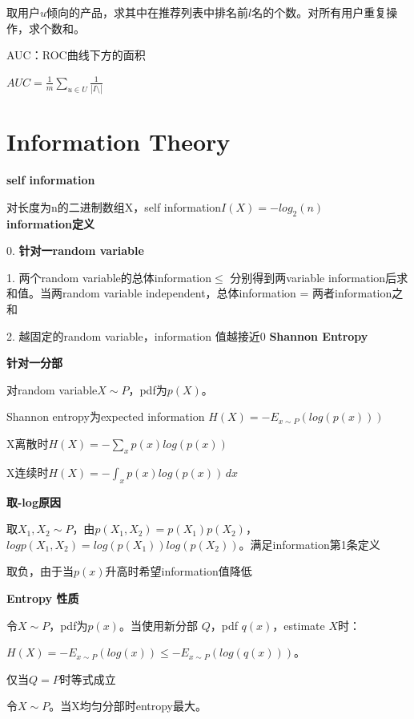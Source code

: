 \documentclass[UTF8]{ctexart}
\begin{document}
  \quad \quad \quad 取用户$u$倾向的产品，求其中在推荐列表中排名前$l$名的个数。对所有用户重复操作，求个数和。

  \quad \quad AUC：ROC曲线下方的面积

  \quad \quad \quad $AUC = \frac{1}{m}\sum_{u \in U}\frac{1}{|I \setminus |}$
  
\section{Information Theory}
\noindent \textbf{self information}

  对长度为n的二进制数组X，self information$I(X) = -log_2(n)$\\
\textbf{information定义}

  0. \textbf{针对一random variable}

  1. 两个random variable的总体information$\leq$ 分别得到两variable information后求和值。当两random variable independent，总体information = 两者information之和

  2. 越固定的random variable，information 值越接近0
\textbf{Shannon Entropy}

  \textbf{针对一分部}

  对random variable$X \sim P$，pdf为$p(X)$。
  
  Shannon entropy为expected information $H(X) = -E_{x \sim P}(log(p(x)))$

  \quad X离散时$H(X) = - \sum_{x} p(x)log(p(x))$

  \quad X连续时$H(X) = -\int_{x} p(x)log(p(x)) \,dx $
  
  \textbf{取-log原因}
  
  \quad 取$X_1, X_2 \sim P$，由$p(X_1, X_2) = p(X_1)p(X_2)$，$logp(X_1, X_2) = log(p(X_1))log(p(X_2))$。满足information第1条定义
  
  \quad 取负，由于当$p(x)$升高时希望information值降低

  \textbf{Entropy 性质}

  \quad 令$X \sim P$，pdf为$p(x)$。当使用新分部 $Q$，pdf $q(x)$，estimate $X$时：

  \quad \quad $H(X) = -E_{x \sim P}(log(x)) \leq -E_{x \sim P}(log(q(x)))$。

  \quad \quad 仅当$Q = P$时等式成立

  \quad 令$X \sim P$。当X均匀分部时entropy最大。
\end{document}
